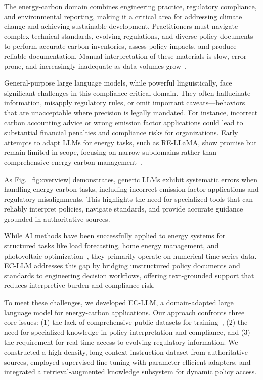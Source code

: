 \documentclass[]{interact}
\theoremstyle{plain}%
\theoremstyle{definition}
\theoremstyle{remark}
\begin{document}
The energy-carbon domain combines engineering practice, regulatory compliance, and environmental reporting, making it a critical area for addressing climate change and achieving sustainable development. Practitioners must navigate complex technical standards, evolving regulations, and diverse policy documents to perform accurate carbon inventories, assess policy impacts, and produce reliable documentation. Manual interpretation of these materials is slow, error-prone, and increasingly inadequate as data volumes grow~\cite{ling2024domainspecializationkeymake}.

General-purpose large language models, while powerful linguistically, face significant challenges in this compliance-critical domain. They often hallucinate information, misapply regulatory rules, or omit important caveats—behaviors that are unacceptable where precision is legally mandated. For instance, incorrect carbon accounting advice or wrong emission factor applications could lead to substantial financial penalties and compliance risks for organizations. Early attempts to adapt LLMs for energy tasks, such as RE-LLaMA, show promise but remain limited in scope, focusing on narrow subdomains rather than comprehensive energy-carbon management~\cite{hemied2024re}.

As Fig.~\ref{fig:overview} demonstrates, generic LLMs exhibit systematic errors when handling energy-carbon tasks, including incorrect emission factor applications and regulatory misalignments. This highlights the need for specialized tools that can reliably interpret policies, navigate standards, and provide accurate guidance grounded in authoritative sources.

While AI methods have been successfully applied to energy systems for structured tasks like load forecasting, home energy management, and photovoltaic optimization~\cite{mahapatra2022hems,sarvi2022mppt_review,ntakolia2022district_heating_ml_review}, they primarily operate on numerical time series data. EC-LLM addresses this gap by bridging unstructured policy documents and standards to engineering decision workflows, offering text-grounded support that reduces interpretive burden and compliance risk.

To meet these challenges, we developed EC-LLM, a domain-adapted large language model for energy-carbon applications. Our approach confronts three core issues: (1) the lack of comprehensive public datasets for training~\cite{guo-etal-2025-sdbench}, (2) the need for specialized knowledge in policy interpretation and compliance, and (3) the requirement for real-time access to evolving regulatory information. We constructed a high-density, long-context instruction dataset from authoritative sources, employed supervised fine-tuning with parameter-efficient adapters, and integrated a retrieval-augmented knowledge subsystem for dynamic policy access.
\end{document}
